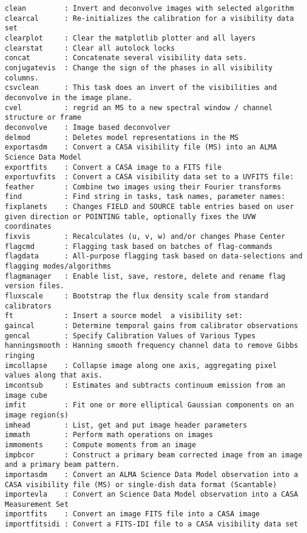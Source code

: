 \begin{verbatim}
clean         : Invert and deconvolve images with selected algorithm
clearcal      : Re-initializes the calibration for a visibility data set
clearplot     : Clear the matplotlib plotter and all layers
clearstat     : Clear all autolock locks
concat        : Concatenate several visibility data sets.
conjugatevis  : Change the sign of the phases in all visibility columns.
csvclean      : This task does an invert of the visibilities and deconvolve in the image plane.
cvel          : regrid an MS to a new spectral window / channel structure or frame
deconvolve    : Image based deconvolver
delmod        : Deletes model representations in the MS
exportasdm    : Convert a CASA visibility file (MS) into an ALMA Science Data Model
exportfits    : Convert a CASA image to a FITS file
exportuvfits  : Convert a CASA visibility data set to a UVFITS file:
feather       : Combine two images using their Fourier transforms
find          : Find string in tasks, task names, parameter names:
fixplanets    : Changes FIELD and SOURCE table entries based on user given direction or POINTING table, optionally fixes the UVW coordinates
fixvis        : Recalculates (u, v, w) and/or changes Phase Center 
flagcmd       : Flagging task based on batches of flag-commands
flagdata      : All-purpose flagging task based on data-selections and flagging modes/algorithms
flagmanager   : Enable list, save, restore, delete and rename flag version files.
fluxscale     : Bootstrap the flux density scale from standard calibrators
ft            : Insert a source model  a visibility set:
gaincal       : Determine temporal gains from calibrator observations
gencal        : Specify Calibration Values of Various Types
hanningsmooth : Hanning smooth frequency channel data to remove Gibbs ringing
imcollapse    : Collapse image along one axis, aggregating pixel values along that axis.
imcontsub     : Estimates and subtracts continuum emission from an image cube
imfit         : Fit one or more elliptical Gaussian components on an image region(s)
imhead        : List, get and put image header parameters
immath        : Perform math operations on images
immoments     : Compute moments from an image
impbcor       : Construct a primary beam corrected image from an image and a primary beam pattern.
importasdm    : Convert an ALMA Science Data Model observation into a CASA visibility file (MS) or single-dish data format (Scantable)
importevla    : Convert an Science Data Model observation into a CASA Measurement Set
importfits    : Convert an image FITS file into a CASA image
importfitsidi : Convert a FITS-IDI file to a CASA visibility data set

\end{verbatim}
